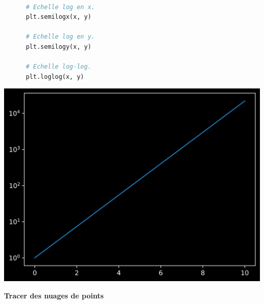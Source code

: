 \documentclass[aspectratio=169]{beamer}
\begin{document}
\begin{frame}[fragile]{}{}
  \vfill
  \begin{minipage}{.48\textwidth}
    \begin{lstlisting}[language=Python]

      # Echelle log en x.
      plt.semilogx(x, y)

      # Echelle log en y.
      plt.semilogy(x, y)

      # Echelle log-log.
      plt.loglog(x, y)
    \end{lstlisting}
  \end{minipage}%
  \hfill
  \begin{minipage}{.48\textwidth}
    \centering
    \includegraphics[width=\textwidth]{scale_line_plot_logy}
  \end{minipage}
  \vfill
\end{frame}





\begin{frame}
  \vfill
  \centering
  \textbf{Tracer des nuages de points}
  \vfill
\end{frame}
\end{document}
